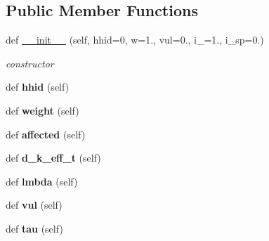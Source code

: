 \subsection*{Public Member Functions}
\begin{DoxyCompactItemize}
\item 
\mbox{\label{classhousehold_1_1Household_aed0855bd50448e9bc536630f16daa2b3}} 
def \hyperlink{classhousehold_1_1Household_aed0855bd50448e9bc536630f16daa2b3}{\+\_\+\+\_\+init\+\_\+\+\_\+} (self, hhid=0, w=1., vul=0., i\+\_=1., i\+\_\+sp=0.)
\begin{DoxyCompactList}\small\item\em constructor \end{DoxyCompactList}\item 
\mbox{\label{classhousehold_1_1Household_aabaf41441c901535463af6fca80e3a4a}} 
def {\bfseries hhid} (self)
\item 
\mbox{\label{classhousehold_1_1Household_afa93ee191a65e945a4200a203966cd00}} 
def {\bfseries weight} (self)
\item 
\mbox{\label{classhousehold_1_1Household_ac9195196e8eb6a01ff7257e66777f52b}} 
def {\bfseries affected} (self)
\item 
\mbox{\label{classhousehold_1_1Household_ab6869bf2e80c8c232825092c39679f6b}} 
def {\bfseries d\+\_\+k\+\_\+eff\+\_\+t} (self)
\item 
\mbox{\label{classhousehold_1_1Household_a7c1a7145a13b716175bbade3b1c590d4}} 
def {\bfseries lmbda} (self)
\item 
\mbox{\label{classhousehold_1_1Household_a84f840e4f5e8e2283f62a952384c6808}} 
def {\bfseries vul} (self)
\item 
\mbox{\label{classhousehold_1_1Household_a2e841d098af926fafc5a27af890fe200}} 
def {\bfseries tau} (self)
\item 
\mbox{\label{classhousehold_1_1Household_a82ed796b45f048ebbc8f716226810cc9}} 

\end{DoxyCompactItemize}
